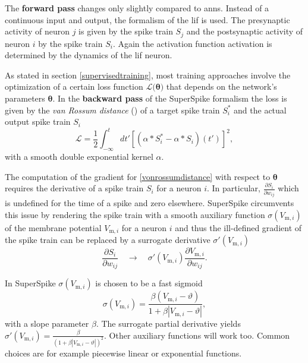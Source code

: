 The \textbf{forward pass} changes only slightly compared to \glspl{ann}. Instead of a continuous input and output, the formalism of the \gls{lif} is used. The presynaptic activity of neuron $j$ is given by the spike train $S_j$ and the postsynaptic activity of neuron $i$ by the spike train $S_i$. Again the activation function \gls{activation} is determined by the dynamics of the \gls{lif} neuron.

As stated in section \ref{supervisedtraining}, most training approaches involve the optimization of a certain loss function $\mathcal{L(\mathbf{\theta)}}$ that depends on the network's parameters $\mathbf{\theta}$. In the \textbf{backward pass} of the SuperSpike formalism the loss is given by the \emph{van Rossum distance} (\citealp{rossum01novel}) of a target spike train $S^*_i$ and the actual output spike train $S_i$
\begin{equation}
\label{vonrossumdistance}
\mathcal{L} = \frac{1}{2} \int^t_{-\infty}dt' \left[\left(\alpha \ast S^*_i - \alpha \ast S_i \right)(t')\right]^2,
\end{equation}
with a smooth double exponential kernel $\alpha$. 

The computation of the gradient for \ref{vonrossumdistance} with respect to $\mathbf{\theta}$ requires the derivative of a spike train $S_i$ for a neuron $i$. In particular, $\frac{\partial{S_i}}{\partial{w_{ij}}}$ which is undefined for the time of a spike and zero elsewhere. SuperSpike circumvents this issue by rendering the spike train with a smooth auxiliary function $\sigma(V_{\text{m},i})$ of the membrane potential $V_{\text{m},i}$ for a neuron $i$ and thus the ill-defined gradient of the spike train can be replaced by a surrogate derivative $\sigma'(V_{\text{m},i})$
\begin{equation*}
\frac{\partial S_i}{\partial w_{ij}} \quad \rightarrow \quad \sigma'(V_{\text{m},i})\frac{\partial V_{\text{m},i}}{\partial w_{ij}}.
\end{equation*}

In SuperSpike $\sigma(V_{\text{m},i})$ is chosen to be a fast sigmoid
\begin{equation}
\sigma(V_{\text{m},i}) = \frac{\beta (V_{\text{m},i} - \vartheta)}{1 + \beta |V_{\text{m},i} - \vartheta|},
\label{auxilliaryfunction}
\end{equation}
with a slope parameter $\beta$. The surrogate partial derivative yields $\sigma'(V_{\text{m},i}) = \frac{\beta}{(1 + \beta |V_{\text{m},i} - \vartheta|)^2}$. Other auxiliary functions will work too. Common choices are for example piecewise linear or exponential functions.

